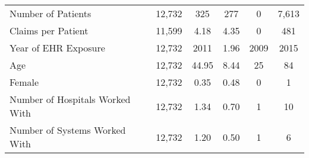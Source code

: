 \begin{table}[h]
\begin{tabular}[t]{lccccc}
\addlinespace[0.3em]
\hspace{1em}Number of Patients & 12,732 & 325 & 277 & 0 & 7,613\\
\hspace{1em}Claims per Patient & 11,599 & 4.18 & 4.35 & 0 & 481\\
\addlinespace[0.3em]
\hspace{1em}Year of EHR Exposure & 12,732 & 2011 & 1.96 & 2009 & 2015\\
\addlinespace[0.3em]
\hspace{1em}Age & 12,732 & 44.95 & 8.44 & 25 & 84\\
\hspace{1em}Female & 12,732 & 0.35 & 0.48 & 0 & 1\\
\hspace{1em}Number of Hospitals Worked With & 12,732 & 1.34 & 0.70 & 1 & 10\\
\hspace{1em}Number of Systems Worked With & 12,732 & 1.20 & 0.50 & 1 & 6\\
\bottomrule
\end{tabular}
\label{tab:sumstats}
\end{table}
